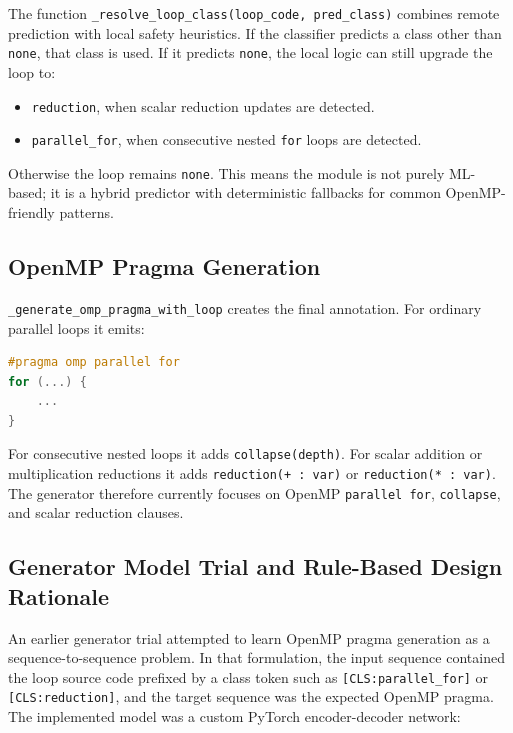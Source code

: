 \documentclass[11pt,a4paper]{article}
\begin{document}
The function \texttt{\_resolve\_loop\_class(loop\_code, pred\_class)} combines
remote prediction with local safety heuristics. If the classifier predicts a
class other than \texttt{none}, that class is used. If it predicts
\texttt{none}, the local logic can still upgrade the loop to:

\begin{itemize}[leftmargin=*]
  \item \texttt{reduction}, when scalar reduction updates are detected.
  \item \texttt{parallel\_for}, when consecutive nested \texttt{for} loops are
        detected.
\end{itemize}

Otherwise the loop remains \texttt{none}. This means the module is not purely
ML-based; it is a hybrid predictor with deterministic fallbacks for common
OpenMP-friendly patterns.

\subsection{OpenMP Pragma Generation}

\texttt{\_generate\_omp\_pragma\_with\_loop} creates the final annotation. For
ordinary parallel loops it emits:

\begin{lstlisting}[language=C]
#pragma omp parallel for
for (...) {
    ...
}
\end{lstlisting}

For consecutive nested loops it adds \texttt{collapse(depth)}. For scalar
addition or multiplication reductions it adds \texttt{reduction(+ : var)} or
\texttt{reduction(* : var)}. The generator therefore currently focuses on
OpenMP \texttt{parallel for}, \texttt{collapse}, and scalar reduction clauses.

\subsection{Generator Model Trial and Rule-Based Design Rationale}

An earlier generator trial attempted to learn OpenMP pragma generation as a
sequence-to-sequence problem. In that formulation, the input sequence contained
the loop source code prefixed by a class token such as
\texttt{[CLS:parallel\_for]} or \texttt{[CLS:reduction]}, and the target
sequence was the expected OpenMP pragma. The implemented model was a custom
PyTorch encoder-decoder network:
\end{document}
